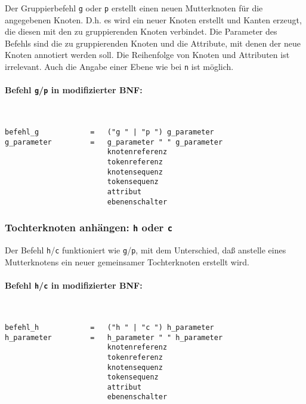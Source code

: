 \documentclass[12pt]{scrartcl}
\begin{document}
Der Gruppierbefehl \texttt{g} oder \texttt{p} erstellt einen neuen Mutterknoten für die angegebenen Knoten. D.h. es wird ein neuer Knoten erstellt und Kanten erzeugt, die diesen mit den zu gruppierenden Knoten verbindet. Die Parameter des Befehls sind die zu gruppierenden Knoten und die Attribute, mit denen der neue Knoten annotiert werden soll. Die Reihenfolge von Knoten und Attributen ist irrelevant. Auch die Angabe einer Ebene wie bei \texttt{n} ist möglich.
\paragraph*{Befehl \texttt{g}/\texttt{p} in modifizierter BNF:}
~
\begin{framed}
\begin{lstlisting}
befehl_g            =   ("g " | "p ") g_parameter
g_parameter         =   g_parameter " " g_parameter
                        knotenreferenz
                        tokenreferenz
                        knotensequenz
                        tokensequenz
                        attribut
                        ebenenschalter
\end{lstlisting}
\end{framed}


\subsubsection{Tochterknoten anhängen: \texttt{h} oder \texttt{c}}

Der Befehl \texttt{h}/\texttt{c} funktioniert wie \texttt{g}/\texttt{p}, mit dem Unterschied, daß anstelle eines Mutterknotens ein neuer gemeinsamer Tochterknoten erstellt wird.
\paragraph*{Befehl \texttt{h}/\texttt{c} in modifizierter BNF:}
~
\begin{framed}
\begin{lstlisting}
befehl_h            =   ("h " | "c ") h_parameter
h_parameter         =   h_parameter " " h_parameter
                        knotenreferenz
                        tokenreferenz
                        knotensequenz
                        tokensequenz
                        attribut
                        ebenenschalter
\end{lstlisting}
\end{framed}
\end{document}
